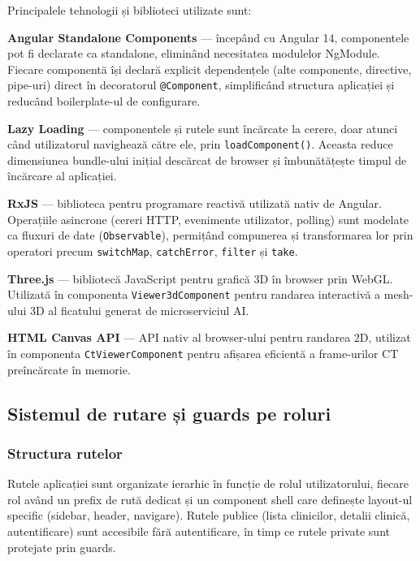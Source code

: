 \documentclass[12pt, a4paper]{report}
\begin{document}
Principalele tehnologii și biblioteci utilizate sunt:

\textbf{Angular Standalone Components} --- începând cu Angular 14, componentele
pot fi declarate ca standalone, eliminând necesitatea modulelor NgModule. Fiecare
componentă își declară explicit dependențele (alte componente, directive, pipe-uri)
direct în decoratorul \texttt{@Component}, simplificând structura aplicației și
reducând boilerplate-ul de configurare.

\textbf{Lazy Loading} --- componentele și rutele sunt încărcate la cerere, doar
atunci când utilizatorul navighează către ele, prin \texttt{loadComponent()}. Aceasta
reduce dimensiunea bundle-ului inițial descărcat de browser și îmbunătățește timpul
de încărcare al aplicației.

\textbf{RxJS} --- biblioteca pentru programare reactivă utilizată nativ de Angular.
Operațiile asincrone (cereri HTTP, evenimente utilizator, polling) sunt modelate ca
fluxuri de date (\texttt{Observable}), permițând compunerea și transformarea lor prin
operatori precum \texttt{switchMap}, \texttt{catchError}, \texttt{filter} și
\texttt{take}.

\textbf{Three.js} --- bibliotecă JavaScript pentru grafică 3D în browser prin WebGL.
Utilizată în componenta \texttt{Viewer3dComponent} pentru randarea interactivă a
mesh-ului 3D al ficatului generat de microserviciul AI.

\textbf{HTML Canvas API} --- API nativ al browser-ului pentru randarea 2D, utilizat
în componenta \texttt{CtViewerComponent} pentru afișarea eficientă a frame-urilor CT
preîncărcate în memorie.


\subsection{Sistemul de rutare și guards pe roluri}

\subsubsection{Structura rutelor}

Rutele aplicației sunt organizate ierarhic în funcție de rolul utilizatorului,
fiecare rol având un prefix de rută dedicat și un component shell care definește
layout-ul specific (sidebar, header, navigare). Rutele publice (lista clinicilor,
detalii clinică, autentificare) sunt accesibile fără autentificare, în timp ce
rutele private sunt protejate prin guards.
\end{document}
